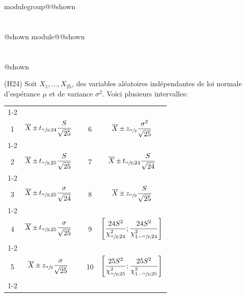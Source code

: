 \documentclass{Evaluation}
\makeatletter
\newcommand{\currentmodulekey}{}
\newcommand{\currentmoduletitle}{}
\newcommand{\currentgroupkey}{}
\newcommand{\currentgrouptitle}{}
\newcommand{\showmoduleifneeded}{%
  \ifx\currentgroupkey\empty\else
    \expandafter\ifx\csname modulegroup@\currentgroupkey @shown\endcsname\relax
      \section*{\currentgrouptitle}%
      \expandafter\gdef\csname modulegroup@\currentgroupkey @shown\endcsname{1}%
    \fi
  \fi
  \expandafter\ifx\csname module@\currentmodulekey @shown\endcsname\relax
    \section*{\currentmoduletitle}%
    \expandafter\gdef\csname module@\currentmodulekey @shown\endcsname{1}%
  \fi
}
\newenvironment{H24}{\showmoduleifneeded}{}
\makeatother
\begin{document}
\begin{questions}
\begin{H24}
\question (H24) Soit $X_1,\hdots, X_{25}$, des variables aléatoires indépendantes de loi normale d'espérance $\mu$ et de variance $\sigma^2$. Voici plusieurs intervalles:
\begin{center}
    
\begin{tabular}{|c|c|c|c|c|}
	\cline{1-2}\cline{4-5}
	&&&&\\[-3mm]
	1 &  $\displaystyle \overline {X}\Mypm t_{\sfrac{\alpha}{2};24}\frac{S}{\sqrt{25}}$
	 & \hspace{0.3cm} &
	 6 &  $\displaystyle \overline {X}\Mypm z_{\sfrac{\alpha}{2}}\frac{\sigma^2}{\sqrt{25}}$
	\\[4mm]
	\cline{1-2}\cline{4-5}
	&&&&\\[-3mm]
	 2 & $\displaystyle \overline {X}\Mypm t_{\sfrac{\alpha}{2};25}\frac{S}{\sqrt{25}}$
	&  &
	 7 & $\displaystyle \overline {X}\Mypm t_{\sfrac{\alpha}{2};24}\frac{S}{\sqrt{24}}$ 
	\\[4mm]
	\cline{1-2}\cline{4-5}
	&&&&\\[-3mm]
	 3 & $\displaystyle \overline {X}\Mypm t_{\sfrac{\alpha}{2};25}\frac{\sigma}{\sqrt{24}}$
	 &  &
	  8 & $\displaystyle \overline {X}\Mypm z_{\sfrac{\alpha}{2}}\frac{S}{\sqrt{25}}$
	 \\[4mm]
	 \cline{1-2}\cline{4-5}
	 &&&&\\[-3mm]
	   4 & $\displaystyle \overline {X}\Mypm t_{\sfrac{\alpha}{2};25}\frac{\sigma}{\sqrt{25}}$
	 &  &
	  9 & $\displaystyle \left[\frac{24S^2}{\chi_{\sfrac{\alpha}{2};24}^2};\frac{24S^2}{\chi_{1-\sfrac{\alpha}{2};24}^2}\right]$
	 \\[5mm]
	 \cline{1-2}\cline{4-5}
	 &&&&\\[-3mm]
	  5 & $\displaystyle \overline {X}\Mypm z_{\sfrac{\alpha}{2}}\frac{\sigma}{\sqrt{25}}$
	 &  &
	  10 & $\displaystyle \left[\frac{25S^2}{\chi_{\sfrac{\alpha}{2};25}^2};\frac{25S^2}{\chi_{1-\sfrac{\alpha}{2};25}^2}\right]$
	 \\[5mm]
	 \cline{1-2}\cline{4-5}


\end{tabular}
\end{center}
\end{H24}
\end{questions}
\end{document}
